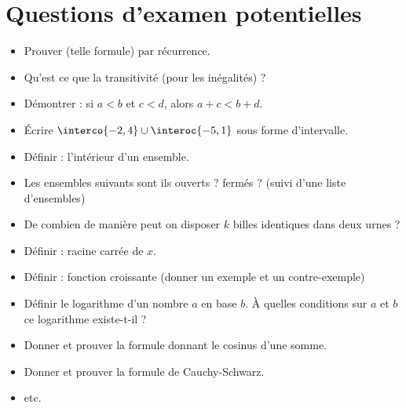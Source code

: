 \documentclass[french,xcolor=svgnames]{beamer}
\begin{document}
\section{Questions d'examen potentielles}
\begin{frame}
\begin{itemize}
\item Prouver (telle formule) par récurrence.
\item Qu'est ce que la transitivité (pour les inégalités) ?
\item Démontrer : si \(a < b\) et \(c < d\), alors \(a + c < b + d\).
\item Écrire \(\interco{-2,4}\cup \interoc{-5,1}\) sous forme d'intervalle.
\item Définir : l'intérieur d'un ensemble.
\item Les ensembles suivants sont ils ouverts ? fermés ? (suivi d'une liste d'ensembles)
\item De combien de manière peut on disposer \(k\) billes identiques dans deux urnes ?
\item Définir : racine carrée de \(x\).
\item Définir : fonction croissante (donner un exemple et un contre-exemple)
\item Définir le logarithme d'un nombre \(a\) en base \(b\). À quelles conditions sur \(a\) et \(b\) ce logarithme existe-t-il ?
\item Donner et prouver la formule donnant le cosinus d'une somme.
\item Donner et prouver la formule de Cauchy-Schwarz.
\item etc.
\end{itemize}
\end{frame}
\end{document}
